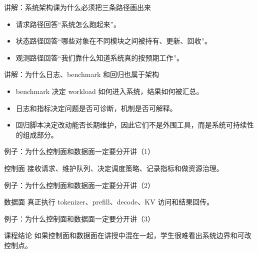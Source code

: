 \begin{frame}{讲解：系统架构课为什么必须把三条路径画出来}
  \begin{itemize}
    \item 请求路径回答“系统怎么跑起来”。
    \item 状态路径回答“哪些对象在不同模块之间被持有、更新、回收”。
    \item 观测路径回答“我们靠什么知道系统真的按预期工作”。
  \end{itemize}
\end{frame}

\begin{frame}{讲解：为什么日志、benchmark 和回归也属于架构}
  \begin{itemize}
    \item benchmark 决定 workload 如何进入系统，结果如何被汇总。
    \item 日志和指标决定问题是否可诊断，机制是否可解释。
    \item 回归脚本决定改动能否长期维护，因此它们不是外围工具，而是系统可持续性的组成部分。
  \end{itemize}
\end{frame}

\begin{frame}{例子：为什么控制面和数据面一定要分开讲（1）}
\begin{block}{控制面}
    接收请求、维护队列、决定调度策略、记录指标和做资源治理。
  \end{block}
\end{frame}

\begin{frame}{例子：为什么控制面和数据面一定要分开讲（2）}
\begin{block}{数据面}
    真正执行 tokenizer、prefill、decode、KV 访问和结果回传。
  \end{block}
\end{frame}

\begin{frame}{例子：为什么控制面和数据面一定要分开讲（3）}
\begin{block}{课程结论}
    如果控制面和数据面在讲授中混在一起，学生很难看出系统边界和可改控制点。
  \end{block}
\end{frame}


